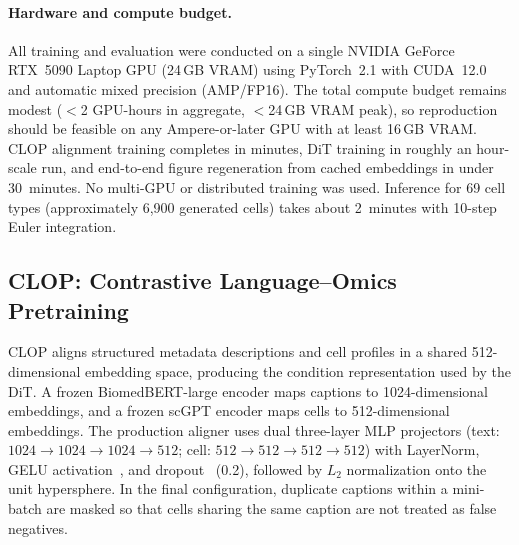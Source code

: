\paragraph{Hardware and compute budget.}
All training and evaluation were conducted on a single NVIDIA GeForce RTX~5090 Laptop GPU (24\,GB VRAM) using PyTorch~2.1 with CUDA~12.0 and automatic mixed precision (AMP/FP16). The total compute budget remains modest ($<$2 GPU-hours in aggregate, $<$24\,GB VRAM peak), so reproduction should be feasible on any Ampere-or-later GPU with at least 16\,GB VRAM. CLOP alignment training completes in minutes, DiT training in roughly an hour-scale run, and end-to-end figure regeneration from cached embeddings in under 30~minutes. No multi-GPU or distributed training was used. Inference for 69 cell types (approximately 6,900 generated cells) takes about 2~minutes with 10-step Euler integration.

\subsection{CLOP: Contrastive Language--Omics Pretraining}\label{sec:clop}

CLOP aligns structured metadata descriptions and cell profiles in a shared 512-dimensional embedding space, producing the condition representation used by the DiT. A frozen BiomedBERT-large encoder maps captions to 1024-dimensional embeddings, and a frozen scGPT encoder maps cells to 512-dimensional embeddings. The production aligner uses dual three-layer MLP projectors (text: $1024 \to 1024 \to 1024 \to 512$; cell: $512 \to 512 \to 512 \to 512$) with LayerNorm, GELU activation~\citep{ref-gelu}, and dropout~\citep{ref-dropout} (0.2), followed by $L_2$ normalization onto the unit hypersphere. In the final configuration, duplicate captions within a mini-batch are masked so that cells sharing the same caption are not treated as false negatives.

